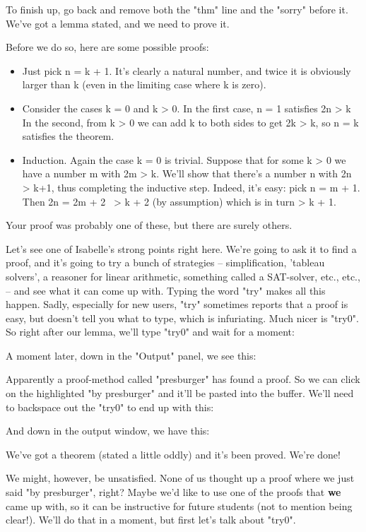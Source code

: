 To finish up, go back and remove both the "thm" line and the "sorry" before it. We've got a lemma stated, and we need to prove it. 

Before we do so, here are some possible proofs:

\begin{itemize}
    \item Just pick n = k + 1. It's clearly a natural number, and twice it is obviously larger than k (even in the limiting case where k is zero). 
    \item Consider the cases k = 0 and k > 0. In the first case, n = 1 satisfies 2n > k In the second, from k > 0 we can add k to both sides to get 2k > k, so n = k satisfies the theorem.
    \item Induction. Again the case k = 0 is trivial. Suppose that for some k > 0 we have a number m with 2m > k. We'll show that there's a number n with 2n > k+1, thus completing the inductive step. Indeed, it's easy: pick n = m + 1. Then 2n = 2m + 2  > k + 2 (by assumption) which is in turn > k + 1. 
\end{itemize}

Your proof was probably one of these, but there are surely others. 

Let's see one of Isabelle's strong points right here. We're going to ask it to find a proof, and it's going to try a bunch of strategies -- simplification, 'tableau solvers', a reasoner for linear arithmetic, something called a SAT-solver, etc., etc., -- and see what it can come up with. Typing the word "try" makes all this happen. Sadly, especially for new users, "try" sometimes reports that a proof is easy, but doesn't tell you what to type, which is infuriating. Much nicer is "try0". So right after our lemma, we'll type "try0" and wait for a moment:

A moment later, down in the "Output" panel, we see this:

Apparently a proof-method called "presburger" has found a proof. So we can click on the highlighted "by presburger" and it'll be pasted into the buffer. We'll need to backspace out the "try0" to end up with this:

And down in the output window, we have this:

We've got a theorem (stated a little oddly) and it's been proved. We're done! 

We might, however, be unsatisfied. None of us thought up a proof where we just said "by presburger", right? Maybe we'd like to use one of the proofs that \textbf{we} came up with, so it can be instructive for future students (not to mention being clear!). We'll do that in a moment, but first let's talk about "try0".

